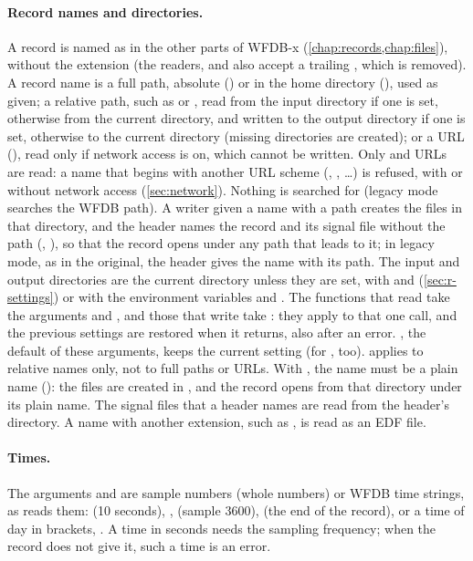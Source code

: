 \paragraph{Record names and directories.} A record is named as in the other parts of
WFDB-x (\cref{chap:records,chap:files}), without the  extension (the readers,
 and  also accept a trailing ,
which is removed). A record name is a full path, absolute () or in the
home directory (), used as given; a relative path,
such as  or , read from the input directory if one is set,
otherwise from the current directory, and written to the output directory if one is set,
otherwise to the current directory (missing directories are created); or a URL
(), read only if network access is
on, which cannot be written. Only  and  URLs are read: a
name that begins with another URL scheme (, , \ldots) is
refused, with or without network access (\cref{sec:network}). Nothing is searched for
(legacy mode searches the WFDB path). A writer given a name with a path creates the files
in that directory, and the header names the record and its signal file without the path
(, ), so that the record opens under any path that leads to it;
in legacy mode, as in the original, the header gives the name with its path. The input
and output directories are the current directory unless they are set, with
 and  (\cref{sec:r-settings})
or with the environment variables  and .
The functions that read take the arguments  and , and
those that write take : they apply to that one call, and the previous settings
are restored when it returns, also after an error. , the default of these
arguments, keeps the current setting (for ,  too).
 applies to relative names only, not to full paths or URLs. With
, the name must be a plain name (): the files are created in
, and the record opens from that directory under its plain name. The signal
files that a header names are read from the header's directory. A name with another
extension, such as , is read as an EDF file.

\paragraph{Times.} The arguments  and  are sample numbers
(whole numbers) or WFDB time strings, as  reads them:  (10
seconds), ,  (sample 3600),  (the end of the
record), or a time of day in brackets, . A time in seconds needs the
sampling frequency; when the record does not give it, such a time is an error.

